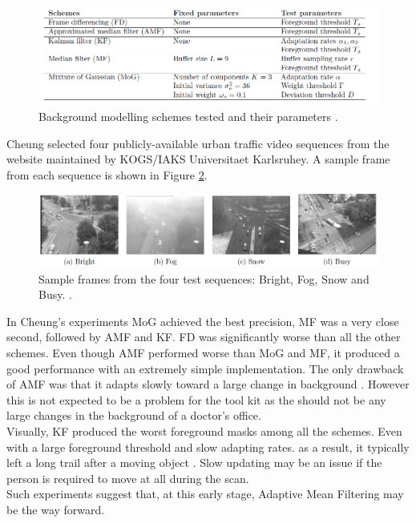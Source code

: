 \begin{figure}[h]
\begin{center}
\includegraphics[scale=0.4]{./research/schemes} 
\end{center}
\caption{Background modelling schemes tested and their parameters \cite{Cheung2007}.}
\label{fig:background modelling schemes tested and their parameters}
\end{figure}

Cheung \cite{Cheung2007} selected four publicly-available urban traffic video sequences from the website maintained by KOGS/IAKS Universitaet Karlsruhey. A sample frame from each sequence is shown in Figure \ref{fig:sample frames from the four test sequences: Bright, Fog, Snow and Busy}.\\ 

\begin{figure}[h]
\begin{center}
\includegraphics[scale=0.4]{./research/samples} 
\end{center}
\caption{Sample frames from the four test sequences: Bright, Fog, Snow and Busy. \cite{Cheung2007}.}
\label{fig:sample frames from the four test sequences: Bright, Fog, Snow and Busy}
\end{figure}

In Cheung's experiments \cite{Cheung2007} MoG achieved the best precision, MF was a very close second, followed by AMF and KF. FD was significantly worse than all the other schemes. Even though AMF performed worse than MoG and MF, it produced a good performance with an extremely simple implementation. The only drawback of AMF was that it adapts slowly toward a large change in background \cite{Cheung2007}. However this is not expected to be a problem for the tool kit as the should not be any large changes in the background of a doctor's office.\\

Visually, KF produced the worst foreground masks among all the schemes. Even with a large foreground threshold and slow adapting rates. as a result, it typically left a long trail after a moving object \cite{Cheung2007}. Slow updating may be an issue if the  person is required to move at all during the scan.\\

Such experiments suggest that, at this early stage, Adaptive Mean Filtering may be the way forward.\\